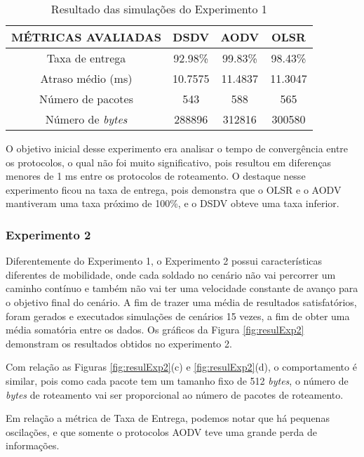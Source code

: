 \begin{table}[H]
	\centering
	\caption{Resultado das simula\c{c}\~oes do Experimento 1}
	\begin{tabular}{ | c | c | c | c | }
		\hline
		M\'ETRICAS AVALIADAS & DSDV & AODV & OLSR \\ \hline
		Taxa de entrega & 92.98\% & 99.83\% & 98.43\% \\ \hline
		Atraso m\'edio (ms) & 10.7575 & 11.4837 & 11.3047 \\ \hline
		N\'umero de pacotes & 543 & 588 & 565 \\ \hline
		N\'umero de \textit{bytes} & 288896 & 312816 & 300580 \\ \hline
	\end{tabular}
	\label{tabExp1Result}
\end{table}

O objetivo inicial desse experimento era analisar o tempo de converg\^encia entre os protocolos, o qual n\~ao foi muito significativo, pois resultou em diferen\c{c}as menores de 1 ms entre os protocolos de roteamento. 
O destaque nesse experimento ficou na taxa de entrega, pois demonstra que o OLSR e o AODV mantiveram uma taxa pr\'oximo de 100\%, e o DSDV obteve uma taxa inferior.

\subsubsection{Experimento 2}
Diferentemente do Experimento 1, o Experimento 2 possui caracter\'isticas diferentes de mobilidade, onde cada soldado no cen\'ario n\~ao vai percorrer um caminho cont\'inuo e tamb\'em n\~ao vai ter uma velocidade constante de avan\c{c}o para o objetivo final do cen\'ario.
A fim de trazer uma m\'edia de resultados satisfat\'orios, foram gerados e executados simula\c{c}\~oes de cen\'arios 15 vezes, a fim de obter uma m\'edia somat\'oria entre os dados.
Os gr\'aficos da Figura \ref{fig:resulExp2} demonstram os resultados obtidos no experimento 2.

Com rela\c{c}\~ao as Figuras \ref{fig:resulExp2}(c) e \ref{fig:resulExp2}(d), o comportamento \'e similar, pois como cada pacote tem um tamanho fixo de 512 \textit{bytes}, o n\'umero de \textit{bytes} de roteamento vai ser proporcional ao n\'umero de pacotes de roteamento.

Em rela\c{c}\~ao a m\'etrica de Taxa de Entrega, podemos notar que h\'a pequenas oscila\c{c}\~oes, e que somente o protocolos AODV teve uma grande perda de informa\c{c}\~oes.

